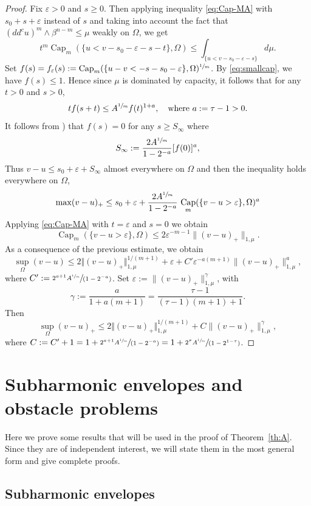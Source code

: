 \documentclass[JEP,XML,SOM,Unicode]{cedram}
\newcommand{\spfrac}[2]{\sfrac{#1}{(#2)}}
\theoremstyle{definition}
\DeclareMathOperator{\Capa}{Cap}
\begin{document}
\begin{proof}
Fix $\varepsilon > 0$ and $s \geq 0$. Then applying inequality \eqref{eq:Cap-MA} with $s_0 + s + \varepsilon$ instead of $s$ and taking into account the fact that $(dd^c u)^m \wedge \beta^{n - m} \leq \mu$ weakly on $\Omega$, we get
\begin{equation} \label{eq:cap-mu}
t^m \Capa_m(\{u< v - s_0 - \varepsilon - s -t\},\Omega)\leq \int_{\{u<v -s_0 - \varepsilon - s\}} d \mu.
\end{equation}
Set $ f (s) = f_\varepsilon (s):=\Capa_m(\{u-v<-s - s_0 -\varepsilon\},\Omega)^{\sfrac{1}{m}}$. By \eqref{eq:smallcap}, we have $f (s) \leq 1$. Hence since $\mu$ is dominated by capacity, it follows that for any $t > 0$ and $s > 0$,
\[
t f (s + t) \leq A^{\sfrac{1}{m}} f (t)^{1 + a}, \quad \text{where } a:= \tau - 1 > 0.
\]
It follows from \cite[Lem.\,2.4]{EGZ09}) that $f (s) = 0$ for any $s\geq S_\infty$ where
\[
S_\infty:=\frac{2 A^{\sfrac{1}{m}} }{1-2^{-a}} [f (0)]^{a},
\]
Thus $v-u\leq s_0 + \varepsilon + S_\infty$ almost everywhere on $\Omega$ and then the inequality holds everywhere on $\Omega$, \ie
\[
\max (v-u)_+ \leq s_ 0 + \varepsilon + \frac{2 A^{\sfrac{1}{m}}}{1-2^{-a}}\, \Capa_m(\{v - u >\varepsilon\},\Omega)^{a}
\]
Applying \eqref{eq:Cap-MA} with $t=\varepsilon$ and $s = 0$ we obtain
\[
\Capa_m(\{v - u > \varepsilon\},\Omega)\leq 2 \varepsilon^{-m-1}\|(v-u)_+\|_{1,\mu}.
\]
As a consequence of the previous estimate, we obtain
\[
\sup_\Omega(v-u)\leq 2 \Vert (v-u)_+\Vert_{1,\mu}^{1 \slash (m+1)} + \varepsilon+ C' \varepsilon^{-a (m+1)}\|(v-u)_+\|^{a}_{1,\mu},
\]
where $C':= \spfrac{2^{a + 1} A^{\sfrac{1}{m}}}{1-2^{-a}}$.
Set $\varepsilon:=\|(v-u)_+\|^\gamma_{1,\mu}$, with
\[
\gamma:=\frac{a}{1 +a(m+1)} = \frac{\tau - 1}{(\tau - 1) (m + 1) + 1}.
\]
Then
\[
\sup_{\Omega}(v-u)_+\leq 2 \Vert (v-u)_+\Vert_{1,\mu}^{1 \slash (m+1)} + C \|(v-u)_+\|^\gamma_{1,\mu},
\]
where $C:= C' + 1 = 1 + \spfrac{2^{a + 1} A^{\sfrac{1}{m}}}{1-2^{-a}} = 1 + \spfrac{2^{\tau} A^{\sfrac{1}{m}}}{1-2^{1 -\tau}}$.
\end{proof}

\section{Subharmonic envelopes and obstacle problems}\label{sec:3}
Here we prove some results that will be used in the proof of Theorem~\ref{th:A}. Since they are of independent interest, we will state them in the most general form and give complete proofs.

\subsection{Subharmonic envelopes }
\end{document}
